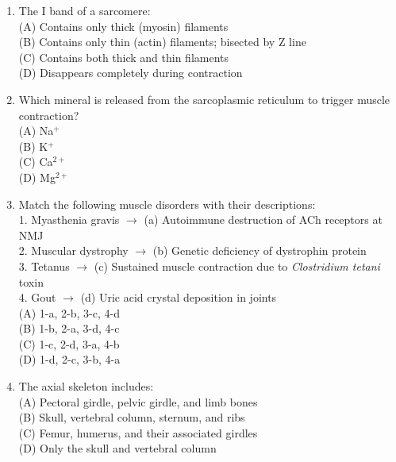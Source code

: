 \documentclass{article}
\begin{document}
\begin{enumerate}[label=Q\arabic*.]
\item The I band of a sarcomere:
\\(A) Contains only thick (myosin) filaments
\\(B) Contains only thin (actin) filaments; bisected by Z line
\\(C) Contains both thick and thin filaments
\\(D) Disappears completely during contraction

\item Which mineral is released from the sarcoplasmic reticulum to trigger muscle contraction?
\\(A) Na$^+$
\\(B) K$^+$
\\(C) Ca$^{2+}$
\\(D) Mg$^{2+}$

\item Match the following muscle disorders with their descriptions:\\
1. Myasthenia gravis $\rightarrow$ (a) Autoimmune destruction of ACh receptors at NMJ\\
2. Muscular dystrophy $\rightarrow$ (b) Genetic deficiency of dystrophin protein\\
3. Tetanus $\rightarrow$ (c) Sustained muscle contraction due to \textit{Clostridium tetani} toxin\\
4. Gout $\rightarrow$ (d) Uric acid crystal deposition in joints
\\(A) 1-a, 2-b, 3-c, 4-d
\\(B) 1-b, 2-a, 3-d, 4-c
\\(C) 1-c, 2-d, 3-a, 4-b
\\(D) 1-d, 2-c, 3-b, 4-a

\item The axial skeleton includes:
\\(A) Pectoral girdle, pelvic girdle, and limb bones
\\(B) Skull, vertebral column, sternum, and ribs
\\(C) Femur, humerus, and their associated girdles
\\(D) Only the skull and vertebral column

\end{enumerate}
\end{document}
